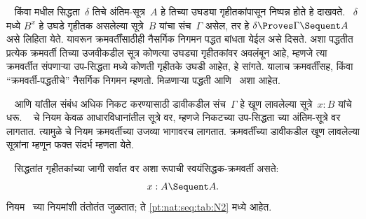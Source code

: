 ~ किंवा
 मधील
सिद्धता~$\delta$
तिचे अंतिम-सूत्र~$A$
हे तिच्या उघड्या गृहीतकांपासून
निष्पन्न होते हे दाखवते.
~$\delta$ मध्ये $B^x$
हे उघडे गृहीतक असलेल्या
सूत्रे~$B$
यांचा संच~$\Gamma$
असेल, तर हे
$\delta \Proves \Gamma
\Sequent A$ असे
लिहिता येते.
यावरून क्रमवर्तींसाठीही
नैसर्गिक निगमन पद्धत
बांधता येईल असे दिसते.
अशा पद्धतीत प्रत्येक
क्रमवर्ती तिच्या उजवीकडील
सूत्र कोणत्या
उघड्या गृहीतकांवर अवलंबून
आहे, म्हणजे त्या
क्रमवर्तीत संपणाऱ्या
उप-सिद्धता मध्ये
कोणती गृहीतके उघडी
आहेत, हे सांगते.
यालाच क्रमवर्तींसह,
किंवा “क्रमवर्ती-पद्धतीचे”
नैसर्गिक निगमन म्हणतो.
मिळणाऱ्या पद्धती
 आणि~
अशा आहेत.

~ आणि
 यांतील
संबंध अधिक निकट करण्यासाठी
डावीकडील संच~$\Gamma$
हे खूण लावलेल्या
सूत्रे~$x:B$
यांचे धरू. ~
चे नियम केवळ
आधारविधानांतील
सूत्रे वर,
म्हणजे निकटच्या
उप-सिद्धता च्या
अंतिम-सूत्रे वर
लागतात. त्यामुळे
 चे नियम
क्रमवर्तीच्या उजव्या
भागावरच लागतात.
क्रमवर्तींच्या डावीकडील
खूण लावलेल्या सूत्रांना
म्हणून फक्त संदर्भ
म्हणता येते.

~ सिद्धतांत
गृहीतकांच्या जागी
सर्वात वर अशा रूपाची
स्वयंसिद्धक-क्रमवर्ती असते:
\[x:A \Sequent A.\]
नियम~
च्या नियमांशी तंतोतंत
जुळतात; ते
\ref{pt:nat:seq:tab:N2} मध्ये आहेत.








